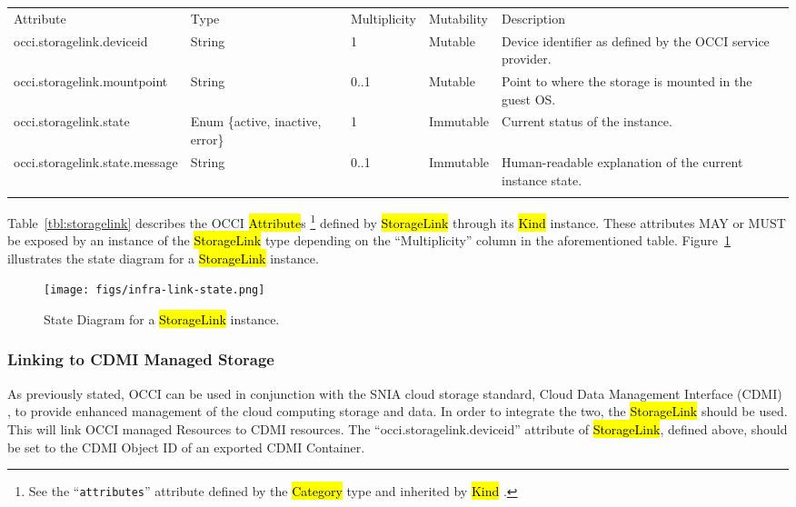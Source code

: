 \documentclass[10pt,a4paper]{article}
\begin{document}
{
	\begin{tabular}{lp{2.5cm}p{1cm}lp{5cm}}
	\toprule
	Attribute&Type&Multi\-plicity&Mutability&Description\\
	\colrule
	occi.storagelink.deviceid & String & 1 & Mutable
	& Device identifier as defined by the OCCI service provider.\\
	occi.storagelink.mountpoint & String & 0..1 & Mutable
	& Point to where the storage is mounted in the guest OS.\\
	occi.storagelink.state & Enum \{active, inactive, error\}& 1
	& Immutable & Current status of the instance.\\
	occi.storagelink.state.message & String & 0..1 & Immutable
	& Human-readable explanation of the current instance state.\\
	\botrule
	\end{tabular}
}

Table~\ref{tbl:storagelink} describes the OCCI \hl{Attribute}s%
\footnote{See the ``{\tt attributes}'' attribute defined by the
  \hl{Category} type and inherited by \hl{Kind} \cite{occi:core}.}
defined by \hl{StorageLink} through its \hl{Kind} instance. These
attributes MAY or MUST be exposed by an instance of the \hl{StorageLink} type
depending on the ``Multiplicity'' column in the aforementioned table.
Figure~\ref{fig:storagelink_state} illustrates the state
diagram for a \hl{StorageLink} instance.

\begin{figure}[!h]
	\centering
	\texttt{[image: figs/infra-link-state.png]}
	\caption{State Diagram for a \hl{StorageLink} instance.}
	\label{fig:storagelink_state}
\end{figure}

\subsubsection{Linking to CDMI Managed Storage}
\label{subsec:storagelink-cdmi}
As previously stated, OCCI can be used in conjunction with the SNIA
cloud storage standard, Cloud Data Management Interface (CDMI)
\cite{cdmi}, to provide enhanced management of the cloud computing
storage and data. In order to integrate the two, the
\hl{StorageLink} should be used. This will link OCCI managed Resources
to CDMI resources. The ``occi.storagelink.deviceid'' attribute of
\hl{StorageLink}, defined above, should be set to the CDMI Object ID
of an exported CDMI Container.
\end{document}
